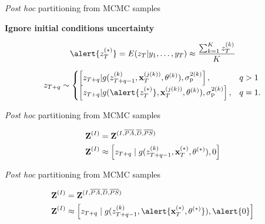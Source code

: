 \documentclass[12pt, compress, aspectratio=1610]{beamer}
\begin{document}
\begin{frame}{%
\protect\hypertarget{partitioning-from-mcmc-samples}{%
\emph{Post hoc} partitioning from MCMC samples}}

\bf{Ignore initial conditions uncertainty}

\begin{equation*}
\alert{z_{T}^{(\ast)}} = E(z_{T} | y_1,\dots,y_T) \approx \frac{\sum^K_{k=1} z_{T}^{(k)}}{K}
\end{equation*}

\begin{equation*}
    z_{T+q} \sim 
\begin{cases}
    \left[z_{T+q} | g(z_{T+q-1}^{(k)}, \textbf{x}_T^{(j(k))}, \boldmath{\theta}^{(k)}), \sigma^{2(k)}_{\text{p}} \right], &q>1 \\
    \left[z_{T+q} | g(\alert{z_{T}^{(\ast)}}, \textbf{x}_T^{(j(k))}, \boldmath{\theta}^{(k)}), \sigma^{2(k)}_{\text{p}} \right], &q=1.
\end{cases}
\end{equation*}

\end{frame}

\begin{frame}{%
\protect\hypertarget{partitioning-from-mcmc-samples-1}{%
\emph{Post hoc} partitioning from MCMC samples}}

\begin{align*}
\textbf{Z}^{(I)} &= \textbf{Z}^{(I,\overline{PA},\overline{D},\overline{PS})} \\
\textbf{Z}^{(I)} &\approx \left[z_{T+q} \; | \; g(z_{T+q-1}^{(k)}, \textbf{x}^{(\ast)}_T, \boldmath{\theta}^{(\ast)}), 0 \right] \\
\end{align*}

\end{frame}

\begin{frame}{%
\protect\hypertarget{partitioning-from-mcmc-samples-2}{%
\emph{Post hoc} partitioning from MCMC samples}}

\begin{align*}
\textbf{Z}^{(I)} &= \textbf{Z}^{(I,\overline{PA},\overline{D},\overline{PS})} \\
\textbf{Z}^{(I)} &\approx \left[z_{T+q} \; | \; g(z_{T+q-1}^{(k)}, \alert{\textbf{x}^{(\ast)}_T, \boldmath{\theta}^{(\ast)}}), \alert{0} \right]
\end{align*}

\end{frame}
\end{document}

